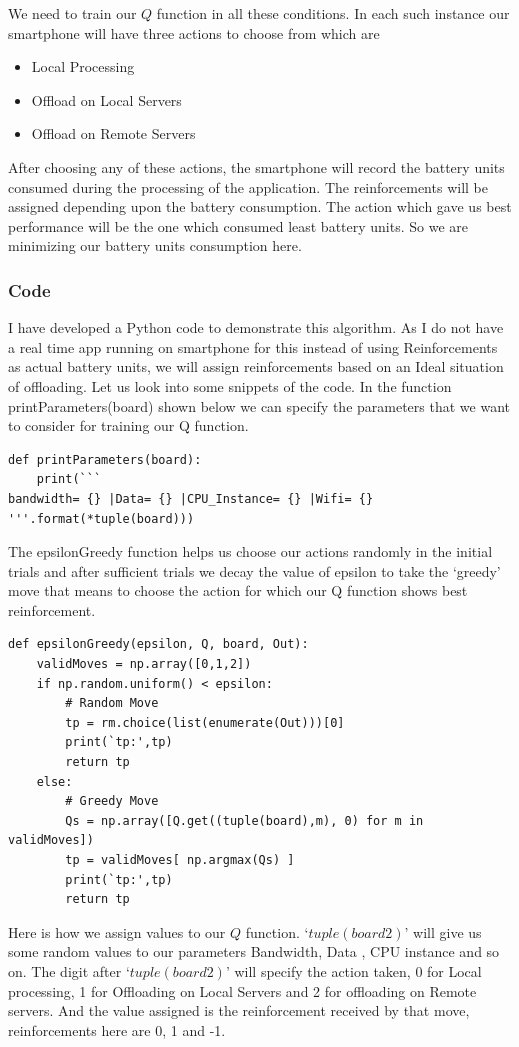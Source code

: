 \documentclass{article}
\begin{document}
We need to train our $Q$ function in all these conditions. In each such instance our smartphone will have three actions to choose from which are
\begin{itemize}
   \item Local Processing
   \item Offload on Local Servers
   \item Offload on Remote Servers
\end{itemize}
After choosing any of these actions, the smartphone will record the battery units consumed during the processing of the application. The reinforcements will be assigned depending upon the battery consumption. The action which gave us best performance will be the one which consumed least battery units. So we are minimizing our battery units consumption here.\par

\subsubsection{Code}
I have developed a Python code to demonstrate this algorithm. As I do not have a real time app running on smartphone for this instead of using Reinforcements as actual battery units, we will assign reinforcements based on an Ideal situation of offloading. Let us look into some snippets of the code. In the function printParameters(board) shown below we can specify the parameters that we want to consider for training our Q function.
\begin{small}
\begin{lstlisting}
def printParameters(board):
    print(```
bandwidth= {} |Data= {} |CPU_Instance= {} |Wifi= {}
'''.format(*tuple(board)))
\end{lstlisting}
\end{small}

The epsilonGreedy function helps us choose our actions randomly in the initial trials and after sufficient trials we decay the value of epsilon to take the `greedy' move that means to choose the action for which our Q function shows best reinforcement.
\begin{small}
\begin{lstlisting}
def epsilonGreedy(epsilon, Q, board, Out):
    validMoves = np.array([0,1,2])
    if np.random.uniform() < epsilon:
        # Random Move
        tp = rm.choice(list(enumerate(Out)))[0]
        print(`tp:',tp)
        return tp
    else:
        # Greedy Move
        Qs = np.array([Q.get((tuple(board),m), 0) for m in validMoves])
        tp = validMoves[ np.argmax(Qs) ] 
        print(`tp:',tp)
        return tp
\end{lstlisting}
\end{small}
Here is how we assign values to our $Q$ function. `$tuple(board2)$' will give us some random values to our parameters Bandwidth, Data , CPU instance and so on. The digit after `$tuple(board2)$' will specify the action taken, 0 for Local processing, 1 for Offloading on Local Servers and 2 for offloading on Remote servers. And the value assigned is the reinforcement received by that move, reinforcements here are 0, 1 and -1.
\end{document}
